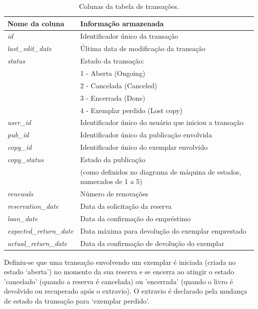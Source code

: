 \documentclass[a4paper]{article}
\begin{document}
\begin{table}[hc]
\centering
\caption{Colunas da tabela de transações.\label{transactions-table}}
\begin{tabular}{ll}
\hline
Nome da coluna & Informação armazenada \\
\hline
\textit{id}                        & {Identificador único da transação} \\
\hline
\textit{last\_edit\_date}        & {Última data de modificação da transação} \\
\hline
\textit{status}                    & Estado da transação:\\
&                                1 - Aberta (Ongoing)\\
&                                2 - Cancelada (Canceled)\\
&                                3 - Encerrada (Done)\\
&                                4 - Exemplar perdido (Lost copy) \\
\hline
\textit{user\_id}                & {Identificador único do usuário que iniciou a transação} \\
\hline
\textit{pub\_id}                & {Identificador único da publicação envolvida} \\
\hline
\textit{copy\_id}                & {Identificador único do exemplar envolvido} \\
\hline
\textit{copy\_status}            & Estado da publicação\\
&                                (como definidos no diagrama de máquina de estados, numerados de 1 a 5) \\
\hline
\textit{renewals}                & {Número de renovações} \\
\hline
\textit{reservation\_date}        & {Data da solicitação da reserva} \\
\hline
\textit{loan\_date}                & {Data da confirmação do empréstimo} \\
\hline
\textit{expected\_return\_date}    & {Data máxima para devolução do exemplar emprestado} \\
\hline
\textit{actual\_return\_date}        & {Data da confirmação de devolução do exemplar} \\
\hline
\end{tabular}
\end{table}

Definiu-se que uma transação envolvendo um exemplar é iniciada (criada no estado ‘aberta’) no momento da sua reserva e se encerra ao atingir o estado 'cancelado' (quando a reserva é cancelada) ou 'encerrada' (quando o livro é devolvido ou recuperado após o extravio). O extravio é declarado pela mudança de estado da transação para ‘exemplar perdido’.
\end{document}
